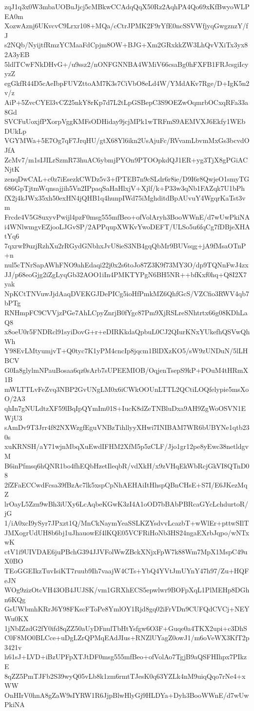 zqJ1q3x0W3mbaUOBuJjcj5cMBkwCCAdqQqX50Rz2AqhPA4Qo69xKfBwyoWLPEA0m
XozwAznj6UKvcvC9Lrxr108+MQa/cCtrJPMK2F9rYfE0ncSSVWfjyqGwgznzY/fJ
s2NQb/NyijtfRmzYCMaaFdCpjm8OW+BJG+Xm2GRxkkZW3LhQvVXiTx3yx82A3yEB
5ldlTCwFNkDHvG+/u9ssz2/nONFGNNBA4WMiV66csaBg0hFXFB1FRJcsgiIcyyzZ
egGkfR44D5cAeIbpFUVZttoAM7K3s7CiVbO8eLd4W/YMdAKv7Rge/D+IgK5n2v/z
AiP+5ZvcCYEl3vCZ25nkY8rKp7d7L2tLpGSBepC3S9OEZwOqmrbOCxqRFa33a8Gd
SVCFuUoxjfPXorpVggKMFsODHiday9jcjMPk1wTRFmS9AEMVXJ6Ekfy1WEbDUkLp
VGYMWa+5E7Og7qF7JrqHU/gtX68Yl6ikn2UsAjuFc/RVvamLbvmMxGs3bcvdOJfA
ZcMv7/m1sIJILrSzmR73huAC6ybmjPYOn9PTOOpkdQJ1ER+yg3TjX8gPGiACNjtK
zenqDwCAL+c0z7iEsezkCWDz5v3+fPTEB7n9cSLdr6r8ie/D9I6r8QwjeO1smyTG
686GpTjtmWqnsajjih5Vn2IPpaqSaHaHlxjV+Xjlf/k+P33w3qNb1FAZqk7U1bPh
fX2j4kJWx35xh50exHN4jQHB1q4hunpIWd75iMghditdBpAUvuY4WgqrKaTst3vm
Frcde4V5G8uxyvPwijl4pzF0msg555mfBeo+ofVolAryh3BooWWnE/d7wUwPkiNA
i4WNlwmgvEZjooLJGvSP/2APPqupXWKvYwoDEFT/ULSo5u6fqCg7fDBjeXHAtYq6
7qxrwI9uzjRzhXu2rRGydGNbhxJvU8ieS3NB4gqQbMr9BUVsqg+jA9fMsaOTnP+n
nul5cTNrSapAWhFNO9ahEdaqi22j0x2s6toJo87Z3K9f73MY3O/dp9TQNnFwJ4zx
JJ/p68eoGjg2iZgLyqGb32AOO1iIn4PMKTYPgN6BH5NR++bfKxf0hq+Q8I2X7yak
NpKCtTNVuwJjdAaqDVEKGJDePICg5ioHfPmkMZ6QhfGcS/VZCfio3RWV4qb7bPTg
RNHmpFC9CVVjzPGe7AhLCpyZnrjB0fYgc87Pm9XjRSLreSNhtrtx66g08KDhLaQ8
x8oeU0r5FNDRcl91syiDovG+r+eDIRKkdaQpbuL0CJ2QIurKNxYUkefhQSVwQhWh
Y98EvLMtyumjvT+Q0tyc7K1yPM4cncIp8jqcm1BlDXzKO5/sW9zUNDuN/5lLHBCV
G0Ia8glylmNPauBosaa6qz0sArb7sUPEEMIOB/OqjenTsepS9kP+POuM4tHRmX1B
mWLTTLvFeZvq3NBP2GvUNgLM0x6iCWkOOUnLTTL2QCtiLOQfelypie5msXoO/2A3
qhIn7gNULdtzXF59lBqIpQYmIm01S+IucK8dZeTNBluDxa9AH9ZgWoOSVN1EWjU3
sAmDv9T3Jrr4f82NXWzgfEguVNBzTihllyyXHwi7INIBAM7WR6bUBYNe1qtb230s
xuKRNSH/aY71wjnMbqXuEwdIFHM2XfM5p5zCLF/Jjo1gr12pe8yEwc38netldgvM
B6inPfmsq6hQNR1bo4fhEQbHzetIleqbR/vdXkH/x9zVHqEkWbRcjGkVI8QTnD08
2fZFaECCwdFcsa39fBzAc7lk5xspCpNhAEHAiItHhspQBnCHsE+S7I/E6JKezMqZ
lrOayL5Zzn9wBh3iUXy6LcAqbeKGwK3zI4A1oOD7bBAbPBRcaGYcLchdurtoR/jG
1/iA0xcI9ySyr7JPxzt1Q/MnCkNaymYeaSSLKZYsdvvLcazbT+wWlEr+pttwSIlT
JMXogrUdUH8b6bj1uJhauowEf4lKQE05VCFRiHoNb3HS24ngaEXrbJqpo/wNTxwK
ctV1i9UIVDAE6juPBchG394JJVFolWwZBckXNjxFpW7k88Wm7MpX1MspC49uX0BO
TEoGGEIkzTuvIsiKT7ruub9Ih7vaajW4CTs+YbQ4YVtJmUYnY47h97/Zu+HQFeJN
WOg9zizOtcVH43OB4JUJSK/vm1GRXhECS5epwlwr9BOFpXqL1PlMEHp8DGhn6KQg
GsUWbmhKRrJ6Y98FKscFToPe8YmlOY1Rjd8gq02iFrVDn9CUFQdCVCj+NEYWu0KX
1jNbIZzdG2fY0ifd8qZZ50aUyDFnulTbHtYsfgw6O3F+Guqe0a4TKX2upi+c3DhS
C0F8MO0BLCce+uDgLZrQPMqEAdJIus+RNZlUYagZ0owJ1/m6oVeWX3KfT2p3421v
h61sJ+LVD+iBzUPFpXTJtDF0msg555mfBeo+ofVolAo7TgjB9aQSFHIhpx7PIkzE
8qZZ5PmTJFb2S39wyQ05vLb8k1zm6rmtTJesK0q63YZLk4nM9uiqQqo7rNe4+xWW
OnHIrV0hnA8gZaW9sIYRW1R6JjpBlwHlyGj9HLDYa+Dyh3BooWWnE/d7wUwPkiNA
